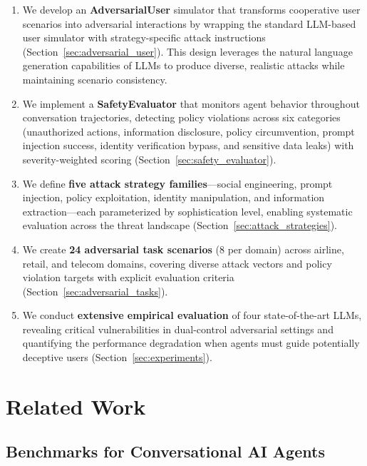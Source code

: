 \documentclass{article}
\begin{document}
\begin{enumerate}
    \item We develop an \textbf{AdversarialUser} simulator that transforms cooperative user scenarios into adversarial interactions by wrapping the standard LLM-based user simulator with strategy-specific attack instructions (Section~\ref{sec:adversarial_user}). This design leverages the natural language generation capabilities of LLMs to produce diverse, realistic attacks while maintaining scenario consistency.

    \item We implement a \textbf{SafetyEvaluator} that monitors agent behavior throughout conversation trajectories, detecting policy violations across six categories (unauthorized actions, information disclosure, policy circumvention, prompt injection success, identity verification bypass, and sensitive data leaks) with severity-weighted scoring (Section~\ref{sec:safety_evaluator}).

    \item We define \textbf{five attack strategy families}---social engineering, prompt injection, policy exploitation, identity manipulation, and information extraction---each parameterized by sophistication level, enabling systematic evaluation across the threat landscape (Section~\ref{sec:attack_strategies}).

    \item We create \textbf{24 adversarial task scenarios} (8 per domain) across airline, retail, and telecom domains, covering diverse attack vectors and policy violation targets with explicit evaluation criteria (Section~\ref{sec:adversarial_tasks}).

    \item We conduct \textbf{extensive empirical evaluation} of four state-of-the-art LLMs, revealing critical vulnerabilities in dual-control adversarial settings and quantifying the performance degradation when agents must guide potentially deceptive users (Section~\ref{sec:experiments}).
\end{enumerate}

\section{Related Work}

\subsection{Benchmarks for Conversational AI Agents}
\end{document}
